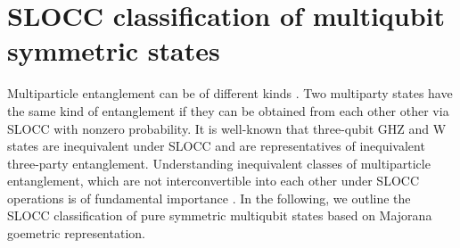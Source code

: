 {\section{SLOCC classification of multiqubit symmetric states}\label{classification}

Multiparticle entanglement  can be of different kinds \cite{Dur}. Two multiparty states have the same kind of entanglement if they can be obtained from each other other via SLOCC with nonzero probability. It is well-known that three-qubit GHZ and W states are inequivalent under SLOCC and are representatives of inequivalent three-party entanglement. Understanding  inequivalent classes of multiparticle entanglement, which are not interconvertible into each other under SLOCC operations is of fundamental importance \cite{Dur,Ver,Lamata,solano}. In the following, we outline \cite{solano} the SLOCC classification of pure symmetric multiqubit states based on Majorana goemetric representation.

}
